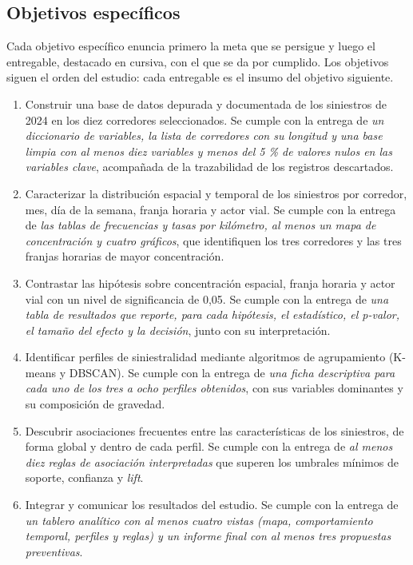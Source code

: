 \documentclass[12pt,letterpaper]{article}
\begin{document}
\hypertarget{objetivos-especuxedficos}{%
\subsection{Objetivos específicos}\label{objetivos-especuxedficos}}

Cada objetivo específico enuncia primero la meta que se persigue y
luego el entregable, destacado en cursiva, con el que se da por
cumplido. Los objetivos siguen el orden del estudio: cada entregable es
el insumo del objetivo siguiente.

\begin{enumerate}[label=\textbf{\arabic*.}, leftmargin=*, align=left, itemsep=6pt]
\item
  Construir una base de datos depurada y documentada de los siniestros
  de 2024 en los diez corredores seleccionados. Se cumple con la entrega
  de \emph{un diccionario de variables, la lista de corredores con su
  longitud y una base limpia con al menos diez variables y menos del
  5 \% de valores nulos en las variables clave}, acompañada de la
  trazabilidad de los registros descartados.
\item
  Caracterizar la distribución espacial y temporal de los siniestros por
  corredor, mes, día de la semana, franja horaria y actor vial. Se
  cumple con la entrega de \emph{las tablas de frecuencias y tasas por
  kilómetro, al menos un mapa de concentración y cuatro gráficos}, que
  identifiquen los tres corredores y las tres franjas horarias de mayor
  concentración.
\item
  Contrastar las hipótesis sobre concentración espacial, franja horaria
  y actor vial con un nivel de significancia de 0,05. Se cumple con la
  entrega de \emph{una tabla de resultados que reporte, para cada
  hipótesis, el estadístico, el p-valor, el tamaño del efecto y la
  decisión}, junto con su interpretación.
\item
  Identificar perfiles de siniestralidad mediante algoritmos de
  agrupamiento (K-means y DBSCAN). Se cumple con la entrega de \emph{una
  ficha descriptiva para cada uno de los tres a ocho perfiles
  obtenidos}, con sus variables dominantes y su composición de
  gravedad.
\item
  Descubrir asociaciones frecuentes entre las características de los
  siniestros, de forma global y dentro de cada perfil. Se cumple con la
  entrega de \emph{al menos diez reglas de asociación interpretadas} que
  superen los umbrales mínimos de soporte, confianza y \emph{lift}.
\item
  Integrar y comunicar los resultados del estudio. Se cumple con la
  entrega de \emph{un tablero analítico con al menos cuatro vistas
  (mapa, comportamiento temporal, perfiles y reglas) y un informe final
  con al menos tres propuestas preventivas}.
\end{enumerate}
\end{document}
